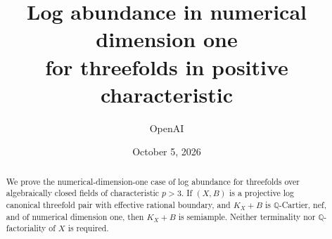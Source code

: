 \documentclass[11pt]{article}
\title{Log abundance in numerical dimension one\\for threefolds in positive characteristic}
\author{OpenAI}
\date{October 5, 2026}
\theoremstyle{definition}
\theoremstyle{remark}
\newcommand{\Q}{\mathbb Q}
\begin{document}
\maketitle
\begin{abstract}
We prove the numerical-dimension-one case of log abundance for threefolds
over algebraically closed fields of characteristic $p>3$. If $(X,B)$ is a
projective log canonical threefold pair with effective rational boundary,
and $K_X+B$ is $\Q$-Cartier, nef, and of numerical dimension one, then
$K_X+B$ is semiample. Neither terminality nor $\Q$-factoriality of $X$
is required.
\end{abstract}







\end{document}
